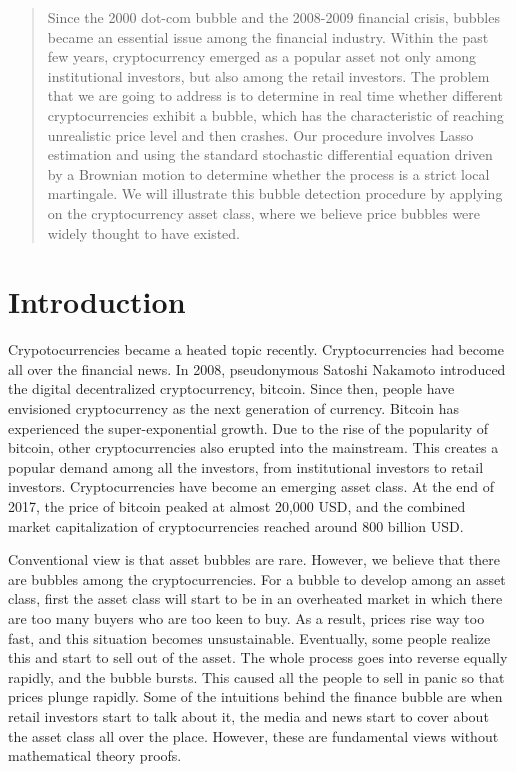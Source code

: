 \begin{spacing}{1.5}
\begin{abstract}
Since the 2000 dot-com bubble and the 2008-2009 financial crisis, bubbles became an essential issue among the financial industry. Within the past few years, cryptocurrency emerged as a popular asset not only among institutional investors, but also among the retail investors. The problem that we are going to address is to determine in real time whether different cryptocurrencies exhibit a bubble, which has the characteristic of reaching unrealistic price level and then crashes. Our procedure involves Lasso estimation and using the standard stochastic differential equation driven by a Brownian motion to determine whether the process is a strict local martingale. We will illustrate this bubble detection procedure by applying on the cryptocurrency asset class, where we believe price bubbles were widely thought to have existed.
\end{abstract}

\section{Introduction}
Crypotocurrencies became a heated topic recently. Cryptocurrencies had become all over the financial news. In 2008, pseudonymous Satoshi Nakamoto introduced the digital decentralized cryptocurrency, bitcoin. Since then, people have envisioned cryptocurrency as the next generation of currency. Bitcoin has experienced the super-exponential growth. Due to the rise of the popularity of bitcoin, other cryptocurrencies also erupted into the mainstream. This creates a popular demand among all the investors, from institutional investors to retail investors. Cryptocurrencies have become an emerging asset class. At the end of 2017, the price of bitcoin peaked at almost 20,000 USD, and the combined market capitalization of cryptocurrencies reached around 800 billion USD.

Conventional view is that asset bubbles are rare. However, we believe that there are bubbles among the cryptocurrencies. For a bubble to develop among an asset class, first the asset class will start to be in an overheated market in which there are too many buyers who are too keen to buy. As a result, prices rise way too fast, and this situation becomes unsustainable. Eventually, some people realize this and start to sell out of the asset. The whole process goes into reverse equally rapidly, and the bubble bursts. This caused all the people to sell in panic so that prices plunge rapidly. Some of the intuitions behind the finance bubble are when retail investors start to talk about it, the media and news start to cover about the asset class all over the place. However, these are fundamental views without mathematical theory proofs. 


\end{spacing}
